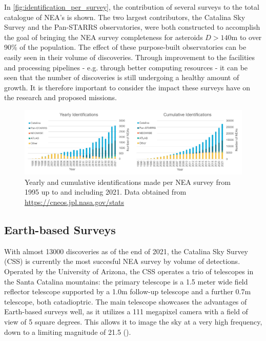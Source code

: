 In \autoref{fig:identification_per_survey}, the contribution of several surveys to the total catalogue of NEA's is shown. The two largest contributors, the Catalina Sky Survey and the Pan-STARRS observatories, were both constructed to accomplish the goal of bringing the NEA survey completeness for asteroids $D > 140 \mathrm{m}$ to over 90\% of the population. The effect of these purpose-built observatories can be easily seen in their volume of discoveries. Through improvement to the facilities and processing pipelines - e.g. through better computing resources - it can be seen that the number of discoveries is still undergoing a healthy amount of growth. It is therefore important to consider the impact these surveys have on the research and proposed missions.

\begin{figure}[htbp]
 \centering
 \includegraphics[width=1.0\textwidth]{img/identification_per_survey.pdf}
 \caption{Yearly and cumulative identifications made per NEA survey from 1995 up to and including 2021. Data obtained from \url{https://cneos.jpl.nasa.gov/stats}}
 \label{fig:identification_per_survey}
\end{figure}


\subsection{Earth-based Surveys}
With almost 13000 discoveries as of the end of 2021, the Catalina Sky Survey (CSS) is currently the most succesful NEA survey by volume of detections. Operated by the University of Arizona, the CSS operates a trio of telescopes in the Santa Catalina mountains: the primary telescope is a 1.5 meter wide field reflector telescope supported by a 1.0m follow-up telescope and a further 0.7m telescope, both catadioptric. The main telescope showcases the advantages of Earth-based surveys well, as it utilizes a 111 megapixel camera with a field of view of 5 square degrees. This allows it to image the sky at a very high frequency, down to a limiting magnitude of 21.5 (\cite{CatalinaSkySurvey}).\\

